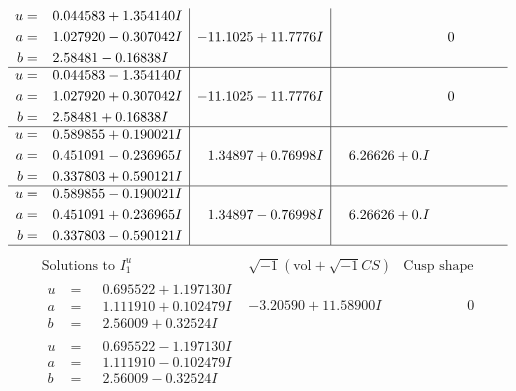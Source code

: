 \documentclass[1p]{elsarticle_modified}
\theoremstyle{definition}
\newcommand{\I}{\sqrt{-1}}
\begin{document}
$$\begin{array}{c|c|c}
\begin{aligned}
u &= \phantom{-}0.044583 + 1.354140 I \\
a &= \phantom{-}1.027920 - 0.307042 I \\
b &= \phantom{-}2.58481 - 0.16838 I\end{aligned}
 & -11.1025 + 11.7776 I & \phantom{-0.000000 } 0 \\ \hline\begin{aligned}
u &= \phantom{-}0.044583 - 1.354140 I \\
a &= \phantom{-}1.027920 + 0.307042 I \\
b &= \phantom{-}2.58481 + 0.16838 I\end{aligned}
 & -11.1025 - 11.7776 I & \phantom{-0.000000 } 0 \\ \hline\begin{aligned}
u &= \phantom{-}0.589855 + 0.190021 I \\
a &= \phantom{-}0.451091 - 0.236965 I \\
b &= \phantom{-}0.337803 + 0.590121 I\end{aligned}
 & \phantom{-}1.34897 + 0.76998 I & \phantom{-}6.26626 + 0. I\phantom{ +0.000000I} \\ \hline\begin{aligned}
u &= \phantom{-}0.589855 - 0.190021 I \\
a &= \phantom{-}0.451091 + 0.236965 I \\
b &= \phantom{-}0.337803 - 0.590121 I\end{aligned}
 & \phantom{-}1.34897 - 0.76998 I & \phantom{-}6.26626 + 0. I\phantom{ +0.000000I}\\
 \hline 
 \end{array}$$\newpage$$\begin{array}{c|c|c}  
\text{Solutions to }I^u_{1}& \I (\text{vol} + \sqrt{-1}CS) & \text{Cusp shape}\\
 \hline 
\begin{aligned}
u &= \phantom{-}0.695522 + 1.197130 I \\
a &= \phantom{-}1.111910 + 0.102479 I \\
b &= \phantom{-}2.56009 + 0.32524 I\end{aligned}
 & -3.20590 + 11.58900 I & \phantom{-0.000000 } 0 \\ \hline\begin{aligned}
u &= \phantom{-}0.695522 - 1.197130 I \\
a &= \phantom{-}1.111910 - 0.102479 I \\
b &= \phantom{-}2.56009 - 0.32524 I\end{aligned}

\end{array}$$
\end{document}
